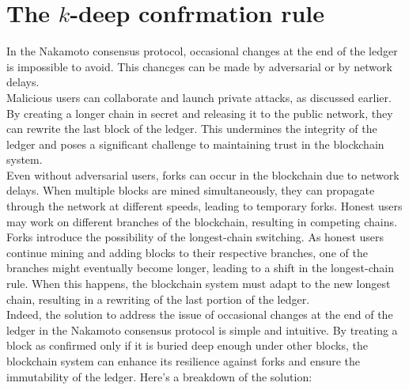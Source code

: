 \documentclass{report}
\begin{document}
\section{The $k$-deep confrmation rule}
In the Nakamoto consensus protocol, occasional changes at the end of the ledger is impossible to avoid. This chancges can be made by adversarial or by network delays.\\
Malicious users can collaborate and launch private attacks, as discussed earlier. By creating a longer chain in secret and releasing it to the public network, they can rewrite the last block of the ledger. This undermines the integrity of the ledger and poses a significant challenge to maintaining trust in the blockchain system.\\
Even without adversarial users, forks can occur in the blockchain due to network delays. When multiple blocks are mined simultaneously, they can propagate through the network at different speeds, leading to temporary forks. Honest users may work on different branches of the blockchain, resulting in competing chains.\\
Forks introduce the possibility of the longest-chain switching. As honest users continue mining and adding blocks to their respective branches, one of the branches might eventually become longer, leading to a shift in the longest-chain rule. When this happens, the blockchain system must adapt to the new longest chain, resulting in a rewriting of the last portion of the ledger.\\
Indeed, the solution to address the issue of occasional changes at the end of the ledger in the Nakamoto consensus protocol is simple and intuitive. By treating a block as confirmed only if it is buried deep enough under other blocks, the blockchain system can enhance its resilience against forks and ensure the immutability of the ledger. Here's a breakdown of the solution:
\end{document}
